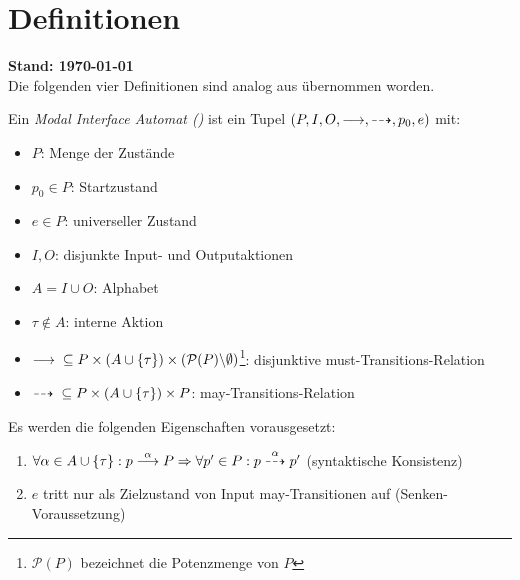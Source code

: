 \chapter{Definitionen}
{\large\textbf{Stand: \today{}}}\\

Die folgenden vier Definitionen sind analog aus\cite{Vogler2016MIA3} übernommen
worden.

\begin{Def}
  Ein \emph{Modal Interface Automat (\MIA{})} ist ein Tupel
  $(P,I,O,\must,\may,p_0,e)$ mit:
  \begin{itemize}
    \item $P$: Menge der Zustände
    \item $p_0\in P$: Startzustand
    \item $e\in P$: universeller Zustand
    \item $I,O$: disjunkte Input- und Outputaktionen
    \item $A = I\cup O$: Alphabet
    \item $\tau\notin A$: interne Aktion
    \item $\must{} \subseteq P\times (A\cup\{\tau\})\times
      (\mathcal{P}(P)\backslash\emptyset )$\footnote{$\mathcal{P}(P)$
      bezeichnet die Potenzmenge von $P$}: disjunktive
      must-Transitions-Relation
    \item $\may{} \subseteq P\times (A\cup\{\tau\})\times
      P$: may-Transitions-Relation
  \end{itemize}
  Es werden die folgenden Eigenschaften vorausgesetzt:
  \begin{enumerate}
    \item $\forall\alpha\in A\cup\{\tau\}:p\must[\alpha]P
      \Rightarrow\forall p'\in P:p\may[\alpha]p'$
      (syntaktische Konsistenz)
    \item $e$ tritt nur als Zielzustand von Input may-Transitionen auf
      (Senken-Voraussetzung) 
  \end{enumerate}
\end{Def}

